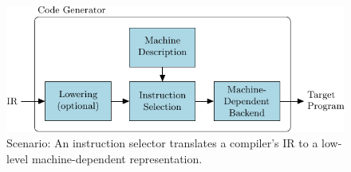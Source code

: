 \begin{figure}[t]
  \begin{center}



    \includegraphics{pgf-fig001}
  \end{center}
  \caption{Scenario: An instruction selector translates a compiler's IR to a
    low-level machine-dependent representation.}
  \label{fig:instruction-selection}
\end{figure}

